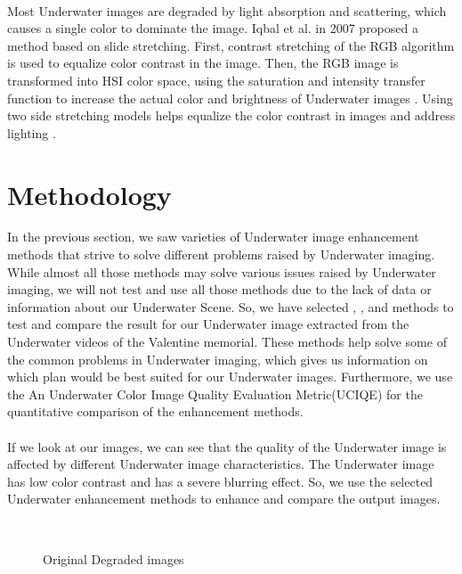 \documentclass[a4paper,11pt,oneside]{article}
\begin{document}
  \\
  Most Underwater images are degraded by light absorption and scattering, which causes a single color to dominate the image. Iqbal et al. in 2007 \cite{4} proposed a method based on slide stretching. First, contrast stretching of the RGB algorithm is used to equalize color contrast in the image. Then, the RGB image is transformed into HSI color space, using the saturation and intensity transfer function to increase the actual color and brightness of Underwater images \cite{4}. Using two side stretching models helps equalize the color contrast in images and address lighting \cite{4}.
 \newpage
  \section{Methodology}
  \label{sec:3}
  In the previous section, we saw varieties of Underwater image enhancement methods that strive to solve different problems raised by Underwater imaging. While almost all those methods may solve various issues raised by Underwater imaging, we will not test and use all those methods due to the lack of data or information about our Underwater Scene. So, we have selected \cite{4}, \cite{8}, \cite{26} and \cite{16} methods to test and compare the result for our Underwater image extracted from the Underwater videos of the Valentine memorial. These methods help solve some of the common problems in Underwater imaging, which gives us information on which plan would be best suited for our Underwater images. Furthermore, we use the An Underwater Color Image Quality Evaluation Metric(UCIQE) \cite{18} for the quantitative comparison of the enhancement methods.\\
  \\
  If we look at our images, we can see that the quality of the Underwater image is affected by different Underwater image characteristics. The Underwater image has low color contrast and has a severe blurring effect. So, we use the selected Underwater enhancement methods to enhance and compare the output images.\\
  \begin{figure}[htp]
  \begin{center}
     \\
  \end{center}
  \caption{Original Degraded images}
  \label{fig:edge}
\end{figure}
\end{document}
